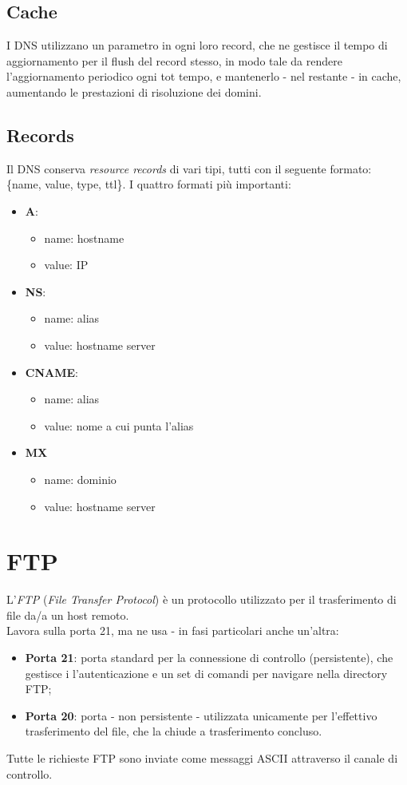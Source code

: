 \subsection{Cache}
I DNS utilizzano un parametro in ogni loro record, che ne gestisce il tempo di aggiornamento per il flush del record stesso, in modo tale da rendere l'aggiornamento periodico ogni tot tempo, e mantenerlo - nel restante - in cache, aumentando le prestazioni di risoluzione dei domini.

\newpage

\subsection{Records}
Il DNS conserva \textit{resource records} di vari tipi, tutti con il seguente formato: \{name, value, type, ttl\}.
I quattro formati più importanti:
\begin{itemize}
	\item \textbf{A}: 
	\begin{itemize}
		\item name: hostname
		\item value: IP
	\end{itemize}
	\item \textbf{NS}: 
	\begin{itemize}
		\item name: alias
		\item value: hostname server
	\end{itemize}
	\item \textbf{CNAME}:
	\begin{itemize}
		\item name: alias
		\item value: nome a cui punta l'alias
	\end{itemize}
	\item \textbf{MX}
	\begin{itemize}
		\item name: dominio
		\item value: hostname server
	\end{itemize}
\end{itemize}

\section{FTP}
L'\textit{FTP} (\textit{File Transfer Protocol}) è un protocollo utilizzato per il trasferimento di file da/a un host remoto. \\
Lavora sulla porta 21, ma ne usa - in fasi particolari anche un'altra:
\begin{itemize}
    \item \textbf{Porta 21}: porta standard per la connessione di controllo (persistente), che gestisce i l'autenticazione e un set di comandi per navigare nella directory FTP;
    \item \textbf{Porta 20}: porta - non persistente - utilizzata unicamente per l'effettivo trasferimento del file, che la chiude a trasferimento concluso.
\end{itemize}
Tutte le richieste FTP sono inviate come messaggi ASCII attraverso il canale di controllo.

